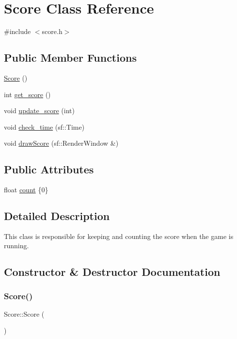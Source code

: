 \hypertarget{classScore}{}\section{Score Class Reference}
\label{classScore}


{\ttfamily \#include $<$score.\+h$>$}

\subsection*{Public Member Functions}
\begin{DoxyCompactItemize}
\item 
\hyperlink{classScore_a039c99843551e5e4b512ecee99e46617}{Score} ()
\item 
int \hyperlink{classScore_a0edd6880a4747e9ec07751030bdd4689}{get\+\_\+score} ()
\item 
void \hyperlink{classScore_a98e9cf2e21db2a2b0ed2751bb53e8255}{update\+\_\+score} (int)
\item 
void \hyperlink{classScore_a4e4e4e4d043b7b4574827b5a670d55a0}{check\+\_\+time} (sf\+::\+Time)
\item 
void \hyperlink{classScore_a933dc121ad262cd9729f973e02a70cf2}{draw\+Score} (sf\+::\+Render\+Window \&)
\end{DoxyCompactItemize}
\subsection*{Public Attributes}
\begin{DoxyCompactItemize}
\item 
float \hyperlink{classScore_afa64d0ac8f47b5eb21c83d9d1d529877}{count} \{0\}
\end{DoxyCompactItemize}


\subsection{Detailed Description}
This class is responsible for keeping and counting the score when the game is running. 

\subsection{Constructor \& Destructor Documentation}
\mbox{\label{classScore_a039c99843551e5e4b512ecee99e46617}} 
\subsubsection{\texorpdfstring{Score()}{Score()}}
{\footnotesize\ttfamily Score\+::\+Score (\begin{DoxyParamCaption}{ }\end{DoxyParamCaption})}

